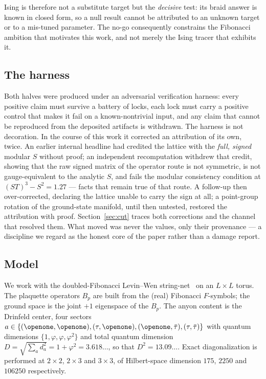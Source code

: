 \documentclass[aps,pra,twocolumn,superscriptaddress,longbibliography,floatfix,nofootinbib]{revtex4-2}
\newcommand{\Id}{\openone}
\begin{document}
Ising is therefore not a substitute target but the \emph{decisive} test: its
braid answer is known in closed form, so a null result cannot be attributed to
an unknown target or to a mis-tuned parameter. The no-go consequently
constrains the Fibonacci ambition that motivates this work, and not merely the
Ising tracer that exhibits it.

\subsection{The harness}
\label{sec:harness}

Both halves were produced under an adversarial verification harness: every
positive claim must survive a battery of locks, each lock must carry a positive
control that makes it fail on a known-nontrivial input, and any claim that
cannot be reproduced from the deposited artifacts is withdrawn. The harness is
not decoration. In the course of this work it corrected an attribution of its
own, twice. An earlier internal headline had credited the lattice with the
\emph{full, signed} modular $S$ without proof; an independent recomputation
withdrew that credit, showing that the raw signed matrix of the operator route
is not symmetric, is not gauge-equivalent to the analytic $S$, and fails the
modular consistency condition at $(ST)^{3}-S^{2} = 1.27$ --- facts that remain
true of that route. A follow-up then over-corrected, declaring the lattice
unable to carry the sign at all; a point-group rotation of the ground-state
manifold, until then untested, restored the attribution with proof.
Section~\ref{sec:cut} traces both corrections and the channel that resolved
them. What moved was never the values, only their provenance --- a discipline
we regard as the honest core of the paper rather than a damage report.

\subsection{Model}
\label{sec:model}

We work with the doubled-Fibonacci Levin--Wen string-net~\cite{LevinWen2005} on
an $L\times L$ torus. The plaquette operators $B_p$ are built from the (real)
Fibonacci $F$-symbols; the ground space is the joint $+1$ eigenspace of the
$B_p$. The anyon content is the Drinfeld center, four sectors
$a\in\{(\Id,\Id),(\tau,\Id),(\Id,\bar\tau),(\tau,\bar\tau)\}$ with quantum
dimensions $\{1,\varphi,\varphi,\varphi^{2}\}$ and total quantum dimension
$D=\sqrt{\sum_a d_a^{2}}=1+\varphi^{2}=3.618\ldots$, so that
$D^{2}=13.09\ldots$. Exact diagonalization is performed at $2\times2$,
$2\times3$ and $3\times3$, of Hilbert-space dimension $175$, $2250$ and
$106250$ respectively.
\end{document}

